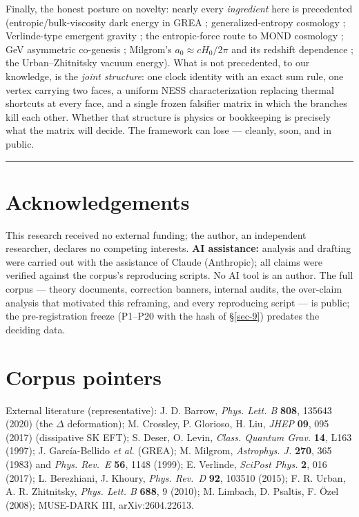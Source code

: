 \documentclass[submission, Phys]{SciPost}
\begin{document}
Finally, the honest posture on novelty: nearly every \emph{ingredient}
here is precedented (entropic/bulk-viscosity dark energy in GREA
\cite{Garcia-Bellido:2024qau}; generalized-entropy cosmology
\cite{Barrow:2020tzx}; Verlinde-type emergent gravity
\cite{Verlinde:2016toy}; the entropic-force route to MOND cosmology
\cite{Zhang:2011uf, Rostami:2025gvs}; GeV asymmetric co-genesis
\cite{Shelton:2010ta, Cheung:2011if}; Milgrom's
\(a_0\approx cH_0/2\pi\) and its redshift dependence
\cite{Milgrom:1983ca, Milgrom:2020cch, Limbach:2008aa}; the
Urban--Zhitnitsky vacuum energy). What is not precedented, to our
knowledge, is the \emph{joint structure}: one clock identity with an
exact sum rule, one vertex carrying two faces, a uniform NESS
characterization replacing thermal shortcuts at every face, and a single
frozen falsifier matrix in which the branches kill each other. Whether
that structure is physics or bookkeeping is precisely what the matrix
will decide. The framework can lose --- cleanly, soon, and in public.

\begin{center}\rule{0.5\linewidth}{0.5pt}\end{center}

\section*{Acknowledgements}\label{acknowledgements}

This research received no external funding; the author, an independent
researcher, declares no competing interests. \textbf{AI assistance:}
analysis and drafting were carried out with the assistance of Claude
(Anthropic); all claims were verified against the corpus's reproducing
scripts. No AI tool is an author. The full corpus --- theory documents,
correction banners, internal audits, the over-claim analysis that
motivated this reframing, and every reproducing script --- is public;
the pre-registration freeze (P1--P20 with the hash of §\ref{sec-9})
predates the deciding data.

\section{Corpus pointers}\label{corpus-pointers}

External literature (representative): J. D. Barrow, \emph{Phys. Lett. B}
\textbf{808}, 135643 (2020) (the \(\Delta\) deformation); M. Crossley,
P. Glorioso, H. Liu, \emph{JHEP} \textbf{09}, 095 (2017) (dissipative SK
EFT); S. Deser, O. Levin, \emph{Class. Quantum Grav.} \textbf{14}, L163
(1997); J. García-Bellido \emph{et al.} (GREA); M. Milgrom,
\emph{Astrophys. J.} \textbf{270}, 365 (1983) and \emph{Phys. Rev.~E}
\textbf{56}, 1148 (1999); E. Verlinde, \emph{SciPost Phys.} \textbf{2},
016 (2017); L. Berezhiani, J. Khoury, \emph{Phys. Rev.~D} \textbf{92},
103510 (2015); F. R. Urban, A. R. Zhitnitsky, \emph{Phys. Lett. B}
\textbf{688}, 9 (2010); M. Limbach, D. Psaltis, F. Özel (2008);
MUSE-DARK III, arXiv:2604.22613.
\end{document}
